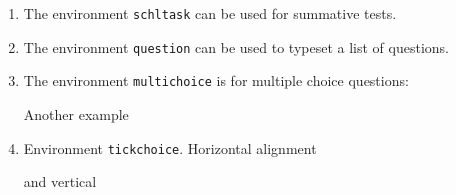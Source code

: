 \documentclass[12pt,a4page]{article}
\def\cellwidth{0.4\textwidth}
\newcommand{\miniexample}[3][t]{%
  \parbox[#1][#3][t]{\cellwidth}{#2}
}
\newcommand{\codeexample}[3][c]{%
  \colorbox[HTML]{b0c4be}{\miniexample[#1]{}{#3}}
}
\newcommand{\textexample}[3][c]{%
  {\footnotesize
    \colorbox[gray]{0.9}{\miniexample[#1]{}{#3}}%
  }
}
\newcommand{\examplerow}[3][10pt]{%
  \par\noindent\strut\hfill\codeexample{#2}{#3}\hspace{#1}\textexample{#2}{#3}\hfill\strut
}
\newlength{\exheight}
\begin{document}
\begin{enumerate}
  \newpage

\item The environment \texttt{schltask} can be used for summative tests.
  \setlength{\exheight}{86pt}
  \examplerow{exampleEnvirSchltask.tex}{\exheight}
\item The environment \verb|question| can be used to typeset a list of questions.
  \setlength{\exheight}{61pt}
  \examplerow{exampleEnvirQuestion.tex}{\exheight}
\item The environment \verb|multichoice| is for multiple choice questions:
  \setlength{\exheight}{61pt}
  \examplerow{exampleEnvirMultichoice01.tex}{\exheight}

  Another example
  \setlength{\exheight}{85pt}
  \examplerow{exampleEnvirMultichoice02.tex}{\exheight}
\item Environment \texttt{tickchoice}. Horizontal alignment
  \setlength{\exheight}{60pt}
  \examplerow{exampleEnvirTickchoice01.tex}{\exheight}

  and vertical

  \setlength{\exheight}{60pt}
  \examplerow{exampleEnvirTickchoice02.tex}{\exheight}
\end{enumerate}
\end{document}
